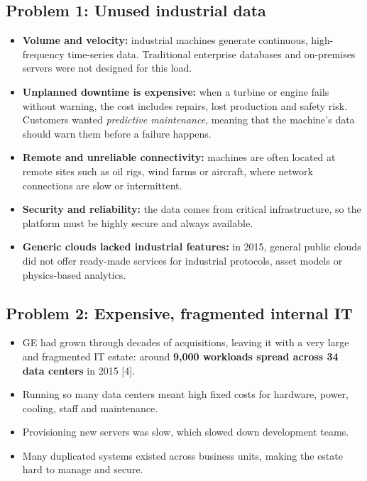 \documentclass[12pt,a4paper]{article}
\begin{document}
\subsection{Problem 1: Unused industrial data}
\begin{itemize}
  \item \textbf{Volume and velocity:} industrial machines generate continuous, high-frequency time-series data. Traditional
        enterprise databases and on-premises servers were not designed for this load.
  \item \textbf{Unplanned downtime is expensive:} when a turbine or engine fails without warning, the cost includes
        repairs, lost production and safety risk. Customers wanted \emph{predictive maintenance}, meaning that
        the machine's data should warn them before a failure happens.
  \item \textbf{Remote and unreliable connectivity:} machines are often located at remote sites such as oil rigs, wind farms or
        aircraft, where network connections are slow or intermittent.
  \item \textbf{Security and reliability:} the data comes from critical infrastructure, so the platform must be highly
        secure and always available.
  \item \textbf{Generic clouds lacked industrial features:} in 2015, general public clouds did not offer ready-made
        services for industrial protocols, asset models or physics-based analytics.
\end{itemize}

\subsection{Problem 2: Expensive, fragmented internal IT}
\begin{itemize}
  \item GE had grown through decades of acquisitions, leaving it with a very large and fragmented IT estate: around
        \textbf{9,000 workloads spread across 34 data centers} in 2015 [4].
  \item Running so many data centers meant high fixed costs for hardware, power, cooling, staff and maintenance.
  \item Provisioning new servers was slow, which slowed down development teams.
  \item Many duplicated systems existed across business units, making the estate hard to manage and secure.
\end{itemize}
\end{document}
